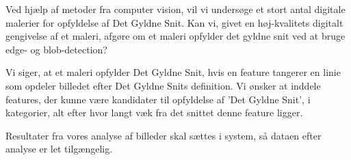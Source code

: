 Ved hjælp af metoder fra computer vision, vil vi undersøge et stort antal
digitale malerier for opfyldelse af Det Gyldne Snit. Kan vi, givet en
høj-kvalitets digitalt gengivelse af et maleri, afgøre om et maleri
opfylder det gyldne snit ved at bruge edge- og blob-detection?

Vi siger, at et maleri opfylder Det Gyldne Snit, hvis en feature tangerer
en linie som opdeler billedet efter Det Gyldne Snits definition. Vi
ønsker at inddele features, der kunne være kandidater til opfyldelse af
'Det Gyldne Snit', i kategorier, alt efter hvor langt væk fra det snittet
denne feature ligger.

Resultater fra vores analyse af billeder skal sættes i system, så dataen efter
analyse er let tilgængelig.


